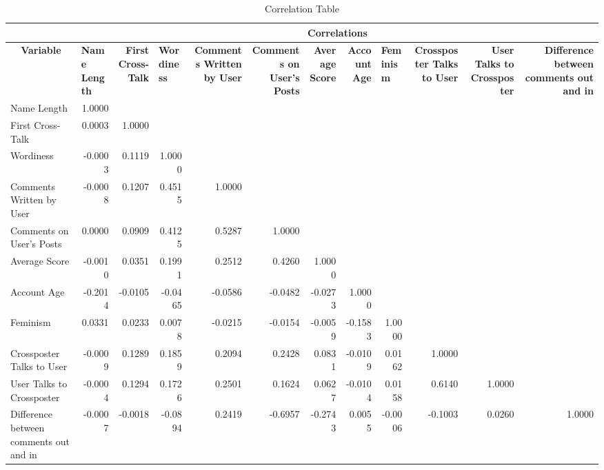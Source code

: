 \documentclass[letterpaper]{article}
\newcommand{\yy}[1]{{\textcolor{green}{yy: #1}}}
\begin{document}
\begin{table}
\caption{Correlation Table}
\centering
\begin{threeparttable}
\begin{adjustbox}{max width=\textwidth}
\begin{tabular}{|p{4cm}||r|r|r|r|r|r|r|r|r|r|r|}
\hline
& \multicolumn{11}{c|}{\textbf{Correlations}} \\\hline
\multicolumn{1}{|c||}{\textbf{Variable}} & \multicolumn{1}{l|}{\textbf{Name Length}} & \multicolumn{1}{p{2cm}|}{\textbf{First Cross-Talk}} & \multicolumn{1}{l|}{\textbf{Wordiness}} & \multicolumn{1}{p{2cm}|}{\textbf{Comments Written by User}} & \multicolumn{1}{p{2cm}|}{\textbf{Comments on User's Posts}} & \multicolumn{1}{p{2cm}|}{\textbf{Average Score}} & \multicolumn{1}{p{2cm}|}{\textbf{Account Age}} & \multicolumn{1}{l|}{\textbf{Feminism}} & \multicolumn{1}{p{2cm}|}{\textbf{Crossposter Talks to User}} & \multicolumn{1}{p{2cm}|}{\textbf{User Talks to Crossposter}} & \multicolumn{1}{p{2cm}|}{\textbf{Difference between comments out and in}} \\\hline
Name Length & 1.0000 &  & &  &  &  & &  &  & & \\
First Cross-Talk & 0.0003 & 1.0000 & & & & & & & & &  \\
Wordiness& -0.0003 & 0.1119 & 1.0000 &  &  & &       &       &       &       &  \\
Comments Written by User & -0.0008 & 0.1207 & 0.4515 & 1.0000 & & & & & & &  \\
Comments on User's Posts & 0.0000 & 0.0909 & 0.4125 & 0.5287 & 1.0000 & & & & & &  \\
Average Score & -0.0010 & 0.0351 & 0.1991 & 0.2512 & 0.4260 & 1.0000 & & & & &  \\
Account Age & -0.2014 & -0.0105 & -0.0465 & -0.0586 & -0.0482 & -0.0273 & 1.0000 &       & & &  \\
Feminism & 0.0331 & 0.0233 & 0.0078 & -0.0215 & -0.0154 & -0.0059 & -0.1583 & 1.0000 & & &  \\
Crossposter Talks to User & -0.0009 & 0.1289 & 0.1859 & 0.2094 & 0.2428 & 0.0831 & -0.0109 & 0.0162 & 1.0000 & &  \\
User Talks to Crossposter & -0.0004 & 0.1294 & 0.1726 & 0.2501 & 0.1624 & 0.0627 & -0.0104 & 0.0158 & 0.6140 & 1.0000 &  \\
Difference between comments out and in & -0.0007 & -0.0018 & -0.0894 & 0.2419 & -0.6957 & -0.2743 & 0.0055 & -0.0006 & -0.1003 & 0.0260 & 1.0000 \\\hline

\end{tabular}%
\end{adjustbox}
\end{threeparttable}
\label{tab:descrstatcorr}
\end{table}
\end{document}
